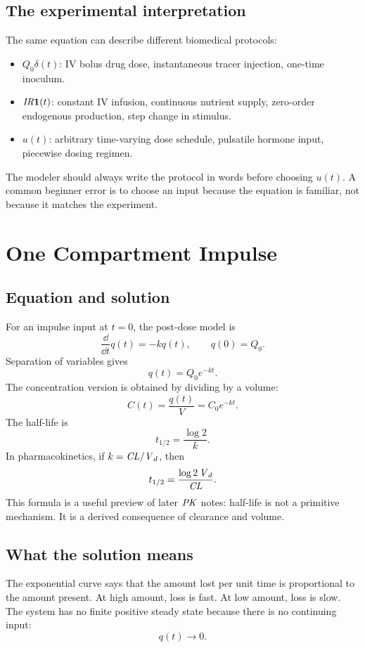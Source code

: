 \documentclass[a4paper]{article}
\newcommand{\ddt}{\frac{\dd}{\dd t}}
\newcommand{\CL}{\ensuremath{\pksym{CL}}}
\newcommand{\Vd}{\ensuremath{\pksym{V}_d}}
\newcommand{\PK}{\ensuremath{\pksym{PK}}}
\newcommand{\IRate}{\ensuremath{\pksym{IR}}}
\newcommand{\unitstep}{\mathbf{1}(t)}
\newcommand{\dirac}{\delta(t)}
\begin{document}
\subsection{The experimental interpretation}

The same equation can describe different biomedical protocols:
\begin{itemize}[leftmargin=2em]
  \item \(Q_0\dirac\): IV bolus drug dose, instantaneous tracer injection, one-time inoculum.
  \item \(\IRate\unitstep\): constant IV infusion, continuous nutrient supply, zero-order endogenous production, step change in stimulus.
  \item \(u(t)\): arbitrary time-varying dose schedule, pulsatile hormone input, piecewise dosing regimen.
\end{itemize}

The modeler should always write the protocol in words before choosing \(u(t)\). A common beginner error is to choose an input because the equation is familiar, not because it matches the experiment.

\section{One Compartment Impulse}

\subsection{Equation and solution}

For an impulse input at \(t=0\), the post-dose model is
\[
  \ddt q(t)=-kq(t),\qquad q(0)=Q_0.
\]
Separation of variables gives
\[
  q(t)=Q_0e^{-kt}.
\]
The concentration version is obtained by dividing by a volume:
\[
  C(t)=\frac{q(t)}{V}=C_0e^{-kt}.
\]
The half-life is
\[
  t_{1/2}=\frac{\log 2}{k}.
\]
In pharmacokinetics, if \(k=\CL/\Vd\), then
\[
  t_{1/2}=\frac{\log 2\,\Vd}{\CL}.
\]
This formula is a useful preview of later \PK{} notes: half-life is not a primitive mechanism. It is a derived consequence of clearance and volume.

\subsection{What the solution means}

The exponential curve says that the amount lost per unit time is proportional to the amount present. At high amount, loss is fast. At low amount, loss is slow. The system has no finite positive steady state because there is no continuing input:
\[
  q(t)\to 0.
\]
\end{document}
